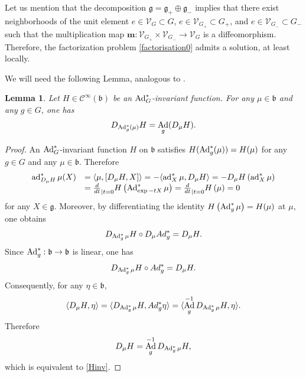 \documentclass[a4paper,12pt,reqno]{amsart}%
\newtheorem{lemma}[theorem]{Lemma}
\theoremstyle{definition}
\theoremstyle{remark}
\numberwithin{theorem}{section}
\numberwithin{equation}{section}
\newcommand{\1}{{\bf 1}}
\DeclareMathOperator{\ad}{\textnormal{ad}}
\DeclareMathOperator{\Ad}{\textnormal{Ad}}
\newcommand{\Cp}{\mathscr{C}}
\newcommand{\g}{{\mathfrak g}}
\newcommand{\bg}{{\mathfrak b}}
\begin{document}
Let us mention that the decomposition $\g = \g_+ \oplus \g_-$ implies that there exist neighborhoods of the unit element $e\in\mathcal{V}_G\subset G$, $e\in\mathcal{V}_{G_+}\subset G_+$, and $e\in\mathcal{V}_{G_-}\subset G_-$ such that the multiplication map $\textbf{m}: \mathcal{V}_{G_+}\times\mathcal{V}_{G_-}\rightarrow \mathcal{V}_G$ is a diffeomorphism.
Therefore, the factorization problem \eqref{factorisation0} admits a solution, at least locally.

We will need the following Lemma, analogous to \cite[Lemma~2.9]{adler}.

\begin{lemma}
   Let $H\in \Cp^\infty(\bg)$ be an $\Ad^*_G$-invariant function.  
   For any $\mu\in \bg$ and any $g\in G$, one has
    \begin{equation}\label{Hinv}
    D_{\Ad^*_g(\mu)} H = \Ad_g(D_\mu H).
    \end{equation}
\end{lemma}


\begin{proof}
An $\Ad^*_G$-invariant function $H$ on $\bg$ satisfies $H(\Ad^*_g(\mu)) = H(\mu)$ for any $g\in G$ and any $\mu \in \bg$. Therefore
   \[
   \begin{array}{ll}
    \ad^*_{D_\mu H}\mu (X) &= \langle \mu, [D_\mu H, X]\rangle = -\langle \ad^*_X \mu, D_\mu H\rangle = -D_\mu H\left(\ad^*_X \mu\right)\\ &  = \frac{d}{dt}_{|t = 0} H\left(\Ad^*_{\exp -tX}\mu\right) = \frac{d}{dt}_{|t = 0} H\left(\mu\right) = 0
    \end{array}
    \]
    for any $X\in \g$.
    Moreover, 
    by differentiating the identity $H\left(\Ad^*_{g}\mu\right) = H(\mu)$ 
    at $\mu$, one obtains
    \[
    D_{\Ad^*_{g}\mu} H\circ D_\mu Ad^*_{g} = D_\mu H.
    \]
    Since $\Ad^*_{g}: \bg\rightarrow \bg$ is linear, one has
    \[
    D_{\Ad^*_{g}\mu} H\circ Ad^*_{g} = D_\mu H.
    \]
    Consequently, for any $\eta\in\bg$,
    \[
    \langle D_\mu H, \eta\rangle = \langle D_{\Ad^*_{g}\mu} H, Ad^*_{g}\eta\rangle = \langle \Ad_g^{-1} D_{\Ad^*_{g}\mu} H, \eta\rangle.
    \]
    Therefore
    \[
    D_\mu H = \Ad_g^{-1} D_{\Ad^*_{g}\mu} H,
    \]
    which is equivalent to \eqref{Hinv}.
    
\end{proof}
\end{document}
